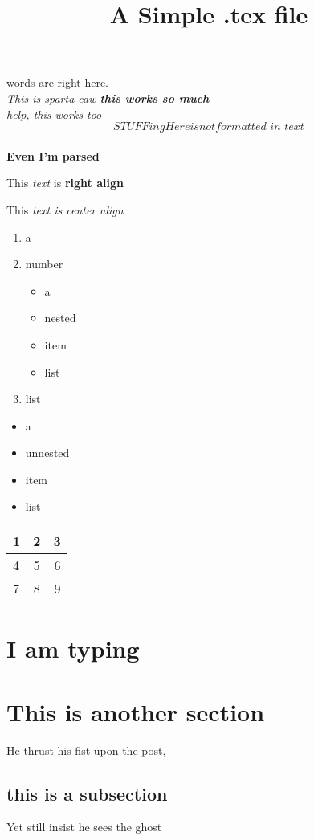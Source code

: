 \documentclass[12pt]{article}
\title{A Simple .tex file}
\begin{document}
	words are right here.
	\\
	\textit{This is sparta caw \textbf{ this \textit{works} so much }} 
	\\
	\textit{ help, this works too}
	\\
	\begin{equation}
		STUFF ing Here is not \textit{formatted in text}
	\end{equation}
	\\
	\textbf{Even I'm parsed}
	\begin{flushright}
		This \textit{text} is \textbf{right align}
	\end{flushright}
	\begin{center}
		This \textit{text is center align}
	\end{center}
	\begin{enumerate}
		\item a
		\item number
		\begin{itemize}
			\item a
			\item nested
			\item item
			\item list
		\end{itemize}
		\item list
	\end{enumerate}
	\begin{itemize}
			\item a
			\item unnested
			\item item
			\item list
	\end{itemize}
	
	\begin{tabular}{ l | c || r | }
		\hline
		1 & 2 & 3 \\
		\hline
		4 & 5 & 6 \\
		\hline
		7 & 8 & 9 \\
		\hline
	\end{tabular}
	
	\section{I am typing}
	\section{This is another section}
	He thrust his fist upon the post,
	\subsection{this is a subsection}
	Yet still insist he sees the ghost
	
\end{document}
